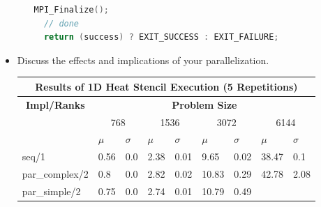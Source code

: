 \documentclass[UTF-8]{article}
\begin{document}
\begin{itemize}
\begin{enumerate}[label=\textbf{\arabic *)}]
\begin{lstlisting}[language=c]
  MPI_Finalize();
  // done
  return (success) ? EXIT_SUCCESS : EXIT_FAILURE;
\end{lstlisting}
            \end{enumerate}
            \pagebreak
		\item Discuss the effects and implications of your parallelization.
            \begin{table}[H]
            \centering
            \begin{tabular}{|lllllllll|}
            \hline
            \multicolumn{9}{|c|}{\textbf{Results of 1D Heat Stencil Execution (5 Repetitions)}} \\ \hline
            \multicolumn{1}{|c|}{\textbf{Impl/Ranks}} &
              \multicolumn{8}{c|}{\textbf{Problem Size}} \\ \hline
            \multicolumn{1}{|c|}{\textbf{}} &
              \multicolumn{2}{c|}{768} &
              \multicolumn{2}{c|}{1536} &
              \multicolumn{2}{c|}{3072} &
              \multicolumn{2}{c|}{6144} \\ \hline
            \multicolumn{1}{|l|}{} &
              \multicolumn{1}{l|}{$\mu$} &
              \multicolumn{1}{l|}{$\sigma$} &
              \multicolumn{1}{l|}{$\mu$} &
              \multicolumn{1}{l|}{$\sigma$} &
              \multicolumn{1}{l|}{$\mu$} &
              \multicolumn{1}{l|}{$\sigma$} &
              \multicolumn{1}{l|}{$\mu$} &
              $\sigma$ \\ \hline
            \multicolumn{1}{|l|}{seq/1} &
              \multicolumn{1}{l|}{0.56} &
              \multicolumn{1}{l|}{0.0} &
              \multicolumn{1}{l|}{2.38} &
              \multicolumn{1}{l|}{0.01} &
              \multicolumn{1}{l|}{9.65} &
              \multicolumn{1}{l|}{0.02} &
              \multicolumn{1}{l|}{38.47} &
              0.1 \\ \hline
            \multicolumn{1}{|l|}{par\_complex/2} &
              \multicolumn{1}{l|}{0.8} &
              \multicolumn{1}{l|}{0.0} &
              \multicolumn{1}{l|}{2.82} &
              \multicolumn{1}{l|}{0.02} &
              \multicolumn{1}{l|}{10.83} &
              \multicolumn{1}{l|}{0.29} &
              \multicolumn{1}{l|}{42.78} &
              2.08 \\ \hline
            \multicolumn{1}{|l|}{par\_simple/2} &
              \multicolumn{1}{l|}{0.75} &
              \multicolumn{1}{l|}{0.0} &
              \multicolumn{1}{l|}{2.74} &
              \multicolumn{1}{l|}{0.01} &
              \multicolumn{1}{l|}{10.79} &
              \multicolumn{1}{l|}{0.49} &

\end{tabular}
\end{table}
\end{itemize}
\end{document}
